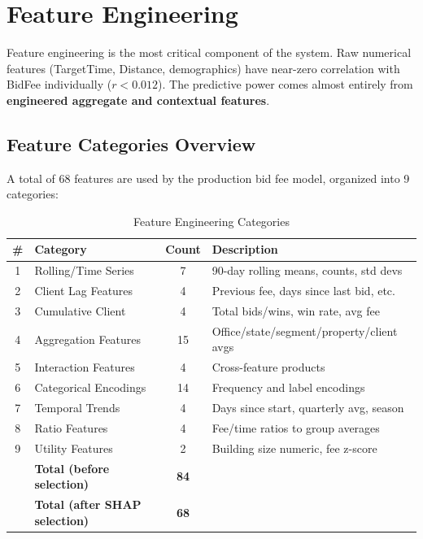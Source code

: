 \documentclass[12pt,a4paper]{article}
\begin{document}
\section{Feature Engineering}
\label{sec:feature-engineering}

Feature engineering is the most critical component of the system. Raw numerical features (TargetTime, Distance, demographics) have near-zero correlation with BidFee individually ($r < 0.012$). The predictive power comes almost entirely from \textbf{engineered aggregate and contextual features}.

\subsection{Feature Categories Overview}

A total of 68 features are used by the production bid fee model, organized into 9 categories:

\begin{table}[H]
\centering
\caption{Feature Engineering Categories}
\label{tab:feature-categories}
\begin{tabular}{clcl}
\toprule
\textbf{\#} & \textbf{Category} & \textbf{Count} & \textbf{Description} \\
\midrule
1 & Rolling/Time Series & 7 & 90-day rolling means, counts, std devs \\
2 & Client Lag Features & 4 & Previous fee, days since last bid, etc. \\
3 & Cumulative Client & 4 & Total bids/wins, win rate, avg fee \\
4 & Aggregation Features & 15 & Office/state/segment/property/client avgs \\
5 & Interaction Features & 4 & Cross-feature products \\
6 & Categorical Encodings & 14 & Frequency and label encodings \\
7 & Temporal Trends & 4 & Days since start, quarterly avg, season \\
8 & Ratio Features & 4 & Fee/time ratios to group averages \\
9 & Utility Features & 2 & Building size numeric, fee z-score \\
\midrule
& \textbf{Total (before selection)} & \textbf{84} & \\
& \textbf{Total (after SHAP selection)} & \textbf{68} & \\
\bottomrule
\end{tabular}
\end{table}
\end{document}
